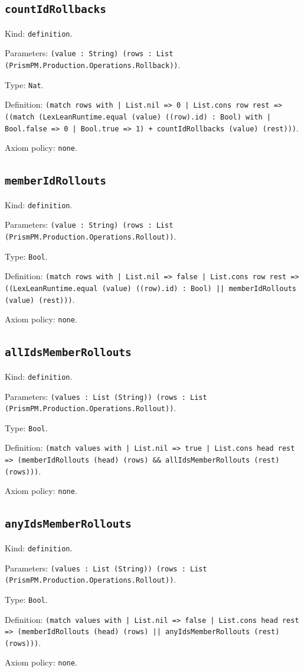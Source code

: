 \documentclass[11pt]{article}
\begin{document}
\subsection*{\texttt{countIdRollbacks}}
\noindent Kind: \texttt{definition}.\par
\noindent Parameters: \texttt{(value : String) (rows : List (PrismPM.Production.Operations.Rollback))}.\par
\noindent Type: \texttt{Nat}.\par
\noindent Definition: \texttt{(match rows with | List.nil => 0 | List.cons row rest => ((match (LexLeanRuntime.equal (value) ((row).id) : Bool) with | Bool.false => 0 | Bool.true => 1) + countIdRollbacks (value) (rest)))}.\par
\noindent Axiom policy: \texttt{none}.\par
\subsection*{\texttt{memberIdRollouts}}
\noindent Kind: \texttt{definition}.\par
\noindent Parameters: \texttt{(value : String) (rows : List (PrismPM.Production.Operations.Rollout))}.\par
\noindent Type: \texttt{Bool}.\par
\noindent Definition: \texttt{(match rows with | List.nil => false | List.cons row rest => ((LexLeanRuntime.equal (value) ((row).id) : Bool) || memberIdRollouts (value) (rest)))}.\par
\noindent Axiom policy: \texttt{none}.\par
\subsection*{\texttt{allIdsMemberRollouts}}
\noindent Kind: \texttt{definition}.\par
\noindent Parameters: \texttt{(values : List (String)) (rows : List (PrismPM.Production.Operations.Rollout))}.\par
\noindent Type: \texttt{Bool}.\par
\noindent Definition: \texttt{(match values with | List.nil => true | List.cons head rest => (memberIdRollouts (head) (rows) \&\& allIdsMemberRollouts (rest) (rows)))}.\par
\noindent Axiom policy: \texttt{none}.\par
\subsection*{\texttt{anyIdsMemberRollouts}}
\noindent Kind: \texttt{definition}.\par
\noindent Parameters: \texttt{(values : List (String)) (rows : List (PrismPM.Production.Operations.Rollout))}.\par
\noindent Type: \texttt{Bool}.\par
\noindent Definition: \texttt{(match values with | List.nil => false | List.cons head rest => (memberIdRollouts (head) (rows) || anyIdsMemberRollouts (rest) (rows)))}.\par
\noindent Axiom policy: \texttt{none}.\par
\end{document}
